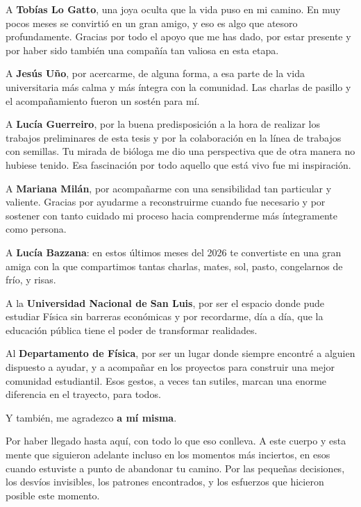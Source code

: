 A \textbf{Tobías Lo Gatto}, una joya oculta que la vida puso en mi camino. En muy pocos meses se convirtió en un gran amigo, y eso es algo que atesoro profundamente. Gracias por todo el apoyo que me has dado, por estar presente y por haber sido también una compañía tan valiosa en esta etapa.

\bigskip

A \textbf{Jesús Uño}, por acercarme, de alguna forma, a esa parte de la vida universitaria más calma y más íntegra con la comunidad. Las charlas de pasillo y el acompañamiento fueron un sostén para mí.

\bigskip

\pagebreak

A \textbf{Lucía Guerreiro}, por la buena predisposición a la hora de realizar los trabajos preliminares de esta tesis y por la colaboración en la línea de trabajos con semillas. Tu mirada de bióloga me dio una perspectiva que de otra manera no hubiese tenido. Esa fascinación por todo aquello que está vivo fue mi inspiración.

\bigskip

A \textbf{Mariana Milán}, por acompañarme con una sensibilidad tan particular y valiente. Gracias por ayudarme a reconstruirme cuando fue necesario y por sostener con tanto cuidado mi proceso hacia comprenderme más íntegramente como persona.

\bigskip

A \textbf{Lucía Bazzana}: en estos últimos meses del 2026 te convertiste en una gran amiga con la que compartimos tantas charlas, mates, sol, pasto, congelarnos de frío, y risas. 

\bigskip

A la \textbf{Universidad Nacional de San Luis}, por ser el espacio donde pude estudiar Física sin barreras económicas y por recordarme, día a día, que la educación pública tiene el poder de transformar realidades.

\bigskip

Al \textbf{Departamento de Física}, por ser un lugar donde siempre encontré a alguien dispuesto a ayudar, y a acompañar en los proyectos para construir una mejor comunidad estudiantil. Esos gestos, a veces tan sutiles, marcan una enorme diferencia en el trayecto, para todos.

\bigskip
\bigskip

Y también, me agradezco \textbf{a mí misma}.

\medskip

Por haber llegado hasta aquí, con todo lo que eso conlleva. A este cuerpo y esta mente que siguieron adelante incluso en los momentos más inciertos, en esos cuando estuviste a punto de abandonar tu camino. Por las pequeñas decisiones, los desvíos invisibles, los patrones encontrados, y los esfuerzos que hicieron posible este momento.

